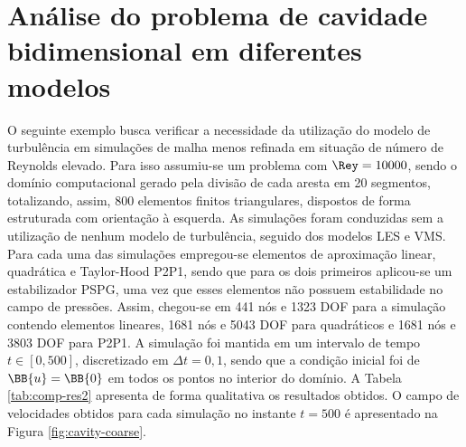 \chapter[APÊNDICE \ref{Ap:Cavity3}]{Análise do problema de cavidade bidimensional em diferentes modelos}
\label{Ap:Cavity3}

O seguinte exemplo busca verificar a necessidade da utilização do modelo de turbulência em simulações de malha menos refinada em situação de número de Reynolds elevado. Para isso assumiu-se um problema com $\Rey=10000$, sendo o domínio computacional gerado pela divisão de cada aresta em 20 segmentos, totalizando, assim, 800 elementos finitos triangulares, dispostos de forma estruturada com orientação à esquerda. As simulações foram conduzidas sem a utilização de nenhum modelo de turbulência, seguido dos modelos LES e VMS. Para cada uma das simulações empregou-se elementos de aproximação linear, quadrática e Taylor-Hood P2P1, sendo que para os dois primeiros aplicou-se um estabilizador PSPG, uma vez que esses elementos não possuem estabilidade no campo de pressões. Assim, chegou-se em 441 nós e 1323 DOF para a simulação contendo elementos lineares, 1681 nós e 5043 DOF para quadráticos e 1681 nós e 3803 DOF para P2P1. A simulação foi mantida em um intervalo de tempo $t\in[0,500]$, discretizado em $\Delta t=0,1$, sendo que a condição inicial foi de $\BB{u}=\BB{0}$ em todos os pontos no interior do domínio. A Tabela \ref{tab:comp-res2} apresenta de forma qualitativa os resultados obtidos. O campo de velocidades obtidos para cada simulação no instante $t=500$ é apresentado na Figura \ref{fig:cavity-coarse}.

